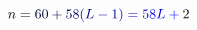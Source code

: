 \documentclass[12pt]{article}
\begin{document}
\makeatletter
\renewcommand*{\@textcolor}[3]{%
  \protect\leavevmode
  \begingroup
    \color#1{#2}#3%
  \endgroup
}
\makeatother
\begin{displaymath}
\mathcolor[RGB]{0,0,15}{n} \mathcolor[RGB]{0,0,30}{=} \mathcolor[RGB]{0,0,45}{6} \mathcolor[RGB]{0,0,60}{0} \mathcolor[RGB]{0,0,75}{+} \mathcolor[RGB]{0,0,90}{5} \mathcolor[RGB]{0,0,105}{8} \mathcolor[RGB]{0,0,120}{(} \mathcolor[RGB]{0,0,135}{L} \mathcolor[RGB]{0,0,150}{-} \mathcolor[RGB]{0,0,165}{1} \mathcolor[RGB]{0,0,180}{)} \mathcolor[RGB]{0,0,195}{=} \mathcolor[RGB]{0,0,210}{5} \mathcolor[RGB]{0,0,225}{8} \mathcolor[RGB]{0,0,240}{L} \mathcolor[RGB]{0,0,255}{+} \mathcolor[RGB]{0,15,0}{2}
\end{displaymath}
\end{document}
